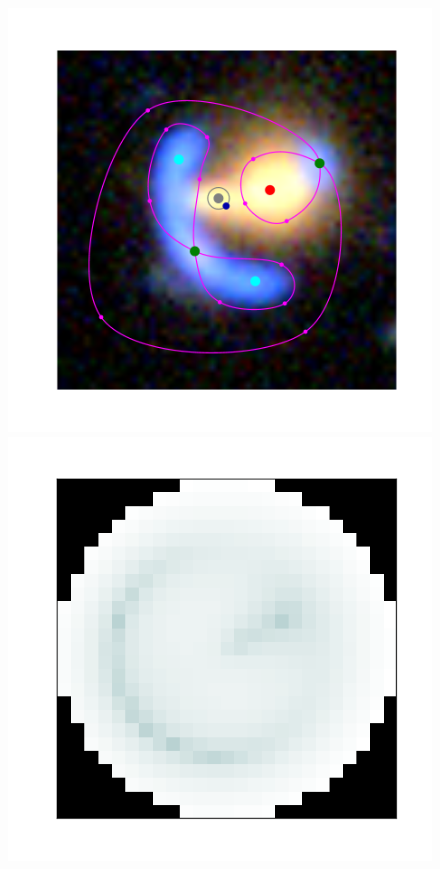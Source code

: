 \begin{figure}
  \centering
  
  \includegraphics[width=\myplotswidth]{fig/006990_input}
  \includegraphics[width=\myplotswidth]{fig/006990_arr_time} \\

\end{figure}

